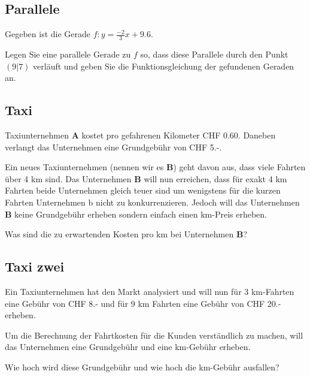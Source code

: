 \subsection{Parallele}
Gegeben ist die Gerade $f: y=\frac{-2}3x+9.6$.

Legen Sie eine parallele Gerade zu $f$ so, dass diese Parallele durch
den Punkt $(9|7)$ verläuft und geben Sie die Funktionsgleichung der
gefundenen Geraden an.

\vspace{15mm}






\newpage
\subsection{Taxi}
Taxiunternehmen \textbf{A} kostet pro gefahrenen Kilometer CHF
0.60. Daneben verlangt das Unternehmen eine Grundgebühr von CHF 5.-.

Ein neues Taxiunternehmen (nennen wir es \textbf{B}) geht davon aus, dass viele Fahrten über 4 km
sind. Das Unternehmen \textbf{B} will nun erreichen, dass für exakt 4
km Fahrten beide Unternehmen gleich teuer sind um wenigstens für die
kurzen Fahrten Unternehmen b nicht zu konkurrenzieren. Jedoch will das
Unternehmen \textbf{B} keine Grundgebühr erheben sondern einfach einen
km-Preis erheben.

Was sind die zu erwartenden Kosten pro km bei Unternehmen \textbf{B}?

\subsection{Taxi zwei}
Ein Taxiunternehmen hat den Markt analysiert und will nun für 3
km-Fahrten  eine Gebühr von CHF 8.- und für 9 km Fahrten eine Gebühr
von CHF 20.- erheben.

Um die Berechnung der Fahrtkosten für die Kunden verständlich zu
machen, will das Unternehmen eine Grundgebühr und eine km-Gebühr
erheben.

Wie hoch wird diese Grundgebühr und wie hoch die km-Gebühr ausfallen?



